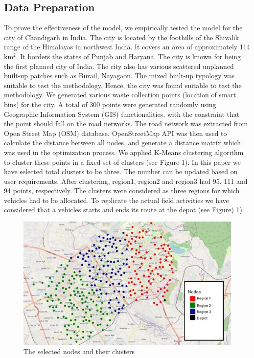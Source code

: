 \documentclass[12pt]{article}
\begin{document}
\subsection{Data Preparation}

To prove the effectiveness of the model, we empirically tested the model for the city of Chandigarh in India. The city is located by the foothills of the Shivalik range of the Himalayas in northwest India. It covers an area of approximately 114 km$^2$. It borders the states of Punjab and Haryana. The city is known for being the first planned city of India. The city also has various scattered unplanned built-up patches such as Burail, Nayagaon. The mixed built-up typology was suitable to test the methodology. Hence, the city was found suitable to test the methodology. We generated various waste collection points (location of smart bins) for the city. A total of 300 points were generated randomly using Geographic Information System (GIS) functionalities, with the constraint that the point should fall on the road networks. The road network was extracted from Open Street Map (OSM) database. OpenStreetMap API was then used to calculate the distance between all nodes, and generate a distance matrix which was used in the optimization process. We applied K-Means clustering algorithm to cluster these points in a fixed set of clusters (see Figure 1). In this paper we have selected total clusters to be three. The number can be updated based on user requirements. After clustering, region1, region2 and region3 had 95, 111 and 94 points, respectively. The clusters were considered as three regions for which vehicles had to be allocated. To replicate the actual field activities we have considered that a vehicles starts and ends its route at the depot (see Figure) \ref{figm})


\begin{figure}[H]
    \centering
    \includegraphics[scale=0.4]{Nodes.png}
    \caption{The selected nodes and their clusters}\label{figm}
\end{figure}
\end{document}
